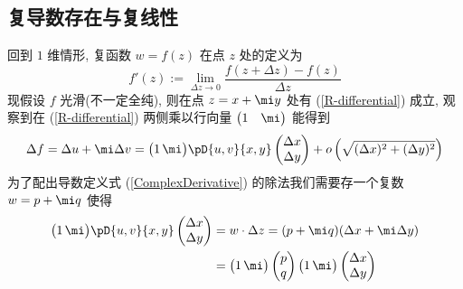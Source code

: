         \subsection{复导数存在与复线性}
            回到 $1$ 维情形, 复函数 $w = f(z)$ 在点 $z$ 处的定义为
            \begin{equation}\label{ComplexDerivative}
                f'(z) := \lim_{\Delta z\rightarrow0}\frac{f(z+\Delta z) - f(z)}{\Delta z}
            \end{equation}
            现假设 $f$ 光滑(不一定全纯), 则在点 $z=x+\mi y$ 处有 (\ref{R-differential}) 成立, 
            观察到在 (\ref{R-differential}) 两侧乘以行向量 
            {\setlength{\arraycolsep}{0.8pt} $\begin{pmatrix} 1 & \mi \end{pmatrix}$} 能得到
            \begin{equation*}
                \Delta f = \Delta u+\mi\Delta v = {\setlength{\arraycolsep}{0.8pt}\begin{pmatrix}  1 & \mi \end{pmatrix}}
                \pD{u,v}{x,y}
                \begin{pmatrix} \Delta x \\ \Delta y \end{pmatrix} + o\left(\sqrt{(\Delta x)^2+(\Delta y)^2}\right)
            \end{equation*}
            为了配出导数定义式 (\ref{ComplexDerivative}) 的除法我们需要存一个复数 $w=p+\mi q$ 使得
            \begin{align*}
                {\setlength{\arraycolsep}{0.8pt}\begin{pmatrix} 1 & \mi \end{pmatrix}}
                \pD{u,v}{x,y}
                \begin{pmatrix} \Delta x \\ \Delta y \end{pmatrix} &= 
                w\cdot\Delta z = (p+\mi q)(\Delta x+\mi\Delta y) \\
                &={\setlength{\arraycolsep}{0.8pt}\begin{pmatrix} 1 & \mi \end{pmatrix}}
                \begin{pmatrix} p \\ q \end{pmatrix}
                {\setlength{\arraycolsep}{0.8pt}\begin{pmatrix} 1 & \mi \end{pmatrix}}
                \begin{pmatrix} \Delta x \\ \Delta y \end{pmatrix}
            \end{align*}

